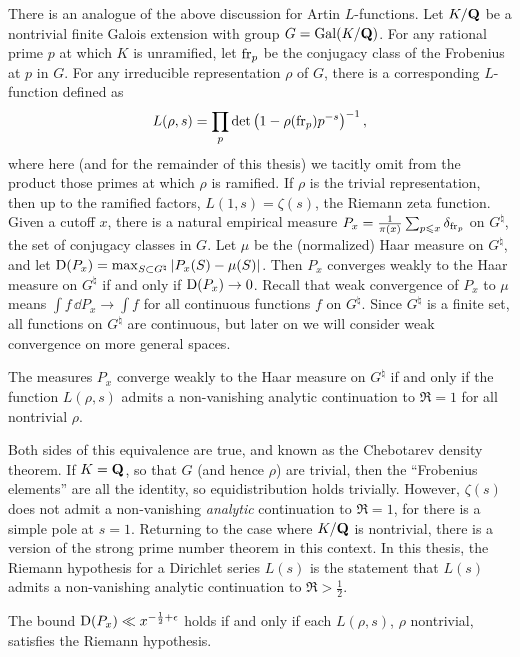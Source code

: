 There is an analogue of the above discussion for Artin $L$-functions. 
Let $K/\mathbf{Q}$ be a nontrivial finite  Galois extension with group 
$G=\operatorname{Gal}(K/\mathbf{Q})$. For any 
rational prime $p$ at which $K$ is unramified, let $\mathrm{fr}_p$ be the conjugacy 
class of the Frobenius at $p$ in $G$. For any irreducible representation 
$\rho$ of $G$, there is a corresponding $L$-function defined as 
\[
	L(\rho,s) = \prod_p \det\left(1-\rho(\mathrm{fr}_p) p^{-s}\right)^{-1} ,
\]
where here (and for the remainder of this thesis) we tacitly omit from the 
product those primes at which $\rho$ is ramified. If $\rho$ is the trivial 
representation, then up to the ramified factors, $L(1,s) = \zeta(s)$, the 
Riemann zeta function. Given a cutoff $x$, there is 
a natural empirical measure 
$P_x = \frac{1}{\pi(x)} \sum_{p\leqslant x} \delta_{\mathrm{fr}_p}$ on 
$G^\natural$, the set of conjugacy classes in $G$. Let $\mu$ be the 
(normalized) Haar measure on $G^\natural$, and let 
$\operatorname{D}(P_x) = \max_{S\subset G^\natural} \left| P_x(S) - \mu(S)\right|$. 
Then $P_x$ converges weakly to the Haar measure on $G^\natural$ if and 
only if $\operatorname{D}(P_x) \to 0$. Recall that weak convergence of $P_x$ to $\mu$ means 
$\int f\, \dd P_x \to \int f$ for all continuous functions $f$ on $G^\natural$. 
Since $G^\natural$ is a finite set, all functions on $G^\natural$ are 
continuous, but later on we will consider weak convergence on more general 
spaces.  

\begin{theorem}
The measures $P_x$ converge weakly to the Haar measure on $G^\natural$ if and 
only if the function $L(\rho,s)$ admits a non-vanishing analytic continuation 
to $\Re = 1$ for all nontrivial $\rho$. 
\end{theorem}

Both sides of this equivalence are true, and known as the Chebotarev density 
theorem. If $K = \mathbf{Q}$, so that $G$ (and hence $\rho$) are trivial, then the 
``Frobenius elements'' are all the identity, so equidistribution holds 
trivially. However, $\zeta(s)$ does not admit a non-vanishing \emph{analytic} 
continuation to $\Re = 1$, for there is a simple pole at $s = 1$. 
Returning to the case where $K/\mathbf{Q}$ is nontrivial, 
there is a version of the strong prime number theorem in 
this context. In this thesis, the Riemann hypothesis for a Dirichlet series 
$L(s)$ is the statement that $L(s)$ admits a non-vanishing analytic 
continuation to $\Re > \frac 1 2$. 

\begin{theorem}
The bound $\operatorname{D}(P_x) \ll x^{-\frac 1 2+\epsilon}$ holds if and only if each
$L(\rho,s)$, $\rho$ nontrivial, satisfies the Riemann hypothesis. 
\end{theorem}

